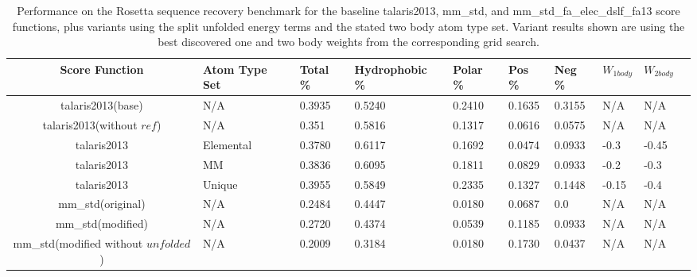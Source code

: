 \begin{table}[!htbp]

\fontsize{9pt}{9pt}
\selectfont

\begin{tabular}{c|lllllllll}
Score Function & Atom Type Set & Total \% & Hydrophobic \% & Polar \% & Pos \% & Neg \% & $W_{1body}$ & $W_{2body}$\\
\hline
talaris2013(base) & N/A & 0.3935 & 0.5240 & 0.2410 & 0.1635 & 0.3155 & N/A & N/A\\
talaris2013(without $ref$) & N/A & 0.351 & 0.5816 & 0.1317 & 0.0616 & 0.0575 & N/A & N/A\\
talaris2013 & Elemental & 0.3780 & 0.6117 & 0.1692 & 0.0474 & 0.0933 & -0.3 & -0.45\\
talaris2013 & MM & 0.3836 & 0.6095 & 0.1811 & 0.0829 & 0.0933 & -0.2 & -0.3\\
talaris2013 & Unique & 0.3955 & 0.5849 & 0.2335 & 0.1327 & 0.1448 & -0.15 & -0.4\\
mm\_std(original) & N/A & 0.2484 & 0.4447 & 0.0180 & 0.0687 & 0.0 & N/A & N/A\\
mm\_std(modified) & N/A & 0.2720 & 0.4374 & 0.0539 & 0.1185 & 0.0933 & N/A & N/A\\
mm\_std(modified without $unfolded$) & N/A & 0.2009 & 0.3184 & 0.0180 & 0.1730 & 0.0437 & N/A & N/A\\

\end{tabular}

\fontsize{10pt}{11pt}
\selectfont
\caption{Performance on the Rosetta sequence recovery benchmark for the baseline talaris2013, mm\_std, and mm\_std\_fa\_elec\_dslf\_fa13 score functions, plus variants using the split unfolded energy terms and the stated two body atom type set. 
Variant results shown are using the best discovered one and two body weights from the corresponding grid search.}
\label{tab:performance}

\end{table}
